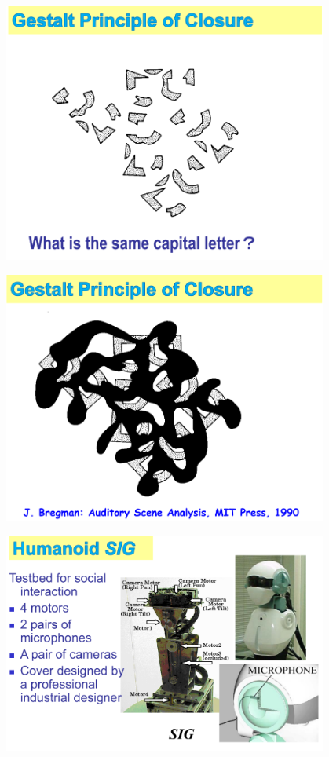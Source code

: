 \documentclass[xetex,mathserif,serif]{beamer}
\begin{document}
	\begin{frame}
		\begin{center}
			\includegraphics[width=0.8\textwidth]{okuno5.png}
		\end{center}
	\end{frame}

	\begin{frame}
		\begin{center}
			\includegraphics[width=0.8\textwidth]{okuno6.png}
		\end{center}
	\end{frame}

	\begin{frame}
		\begin{center}
			\includegraphics[width=0.8\textwidth]{okuno7.png}
		\end{center}
	\end{frame}
\end{document}
